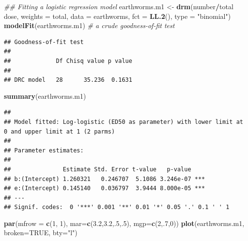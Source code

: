 \documentclass[letterpaper,]{book}
\newenvironment{Shaded}{\begin{snugshade}}{\end{snugshade}}
\newcommand{\CommentTok}[1]{\textcolor[rgb]{0.56,0.35,0.01}{\textit{#1}}}
\newcommand{\DataTypeTok}[1]{\textcolor[rgb]{0.13,0.29,0.53}{#1}}
\newcommand{\DecValTok}[1]{\textcolor[rgb]{0.00,0.00,0.81}{#1}}
\newcommand{\FloatTok}[1]{\textcolor[rgb]{0.00,0.00,0.81}{#1}}
\newcommand{\KeywordTok}[1]{\textcolor[rgb]{0.13,0.29,0.53}{\textbf{#1}}}
\newcommand{\NormalTok}[1]{#1}
\newcommand{\OperatorTok}[1]{\textcolor[rgb]{0.81,0.36,0.00}{\textbf{#1}}}
\newcommand{\OtherTok}[1]{\textcolor[rgb]{0.56,0.35,0.01}{#1}}
\newcommand{\StringTok}[1]{\textcolor[rgb]{0.31,0.60,0.02}{#1}}
\begin{document}
\begin{Shaded}
\begin{Highlighting}[]
\CommentTok{## Fitting a logistic regression model}
\NormalTok{earthworms.m1 <-}\StringTok{ }\KeywordTok{drm}\NormalTok{(number}\OperatorTok{/}\NormalTok{total }\OperatorTok{~}\StringTok{ }\NormalTok{dose, }\DataTypeTok{weights =}\NormalTok{ total, }\DataTypeTok{data =}\NormalTok{ earthworms,}
                     \DataTypeTok{fct =} \KeywordTok{LL.2}\NormalTok{(), }\DataTypeTok{type =} \StringTok{"binomial"}\NormalTok{)}
\KeywordTok{modelFit}\NormalTok{(earthworms.m1)  }\CommentTok{# a crude goodness-of-fit test}
\end{Highlighting}
\end{Shaded}

\begin{verbatim}
## Goodness-of-fit test
## 
##             Df Chisq value p value
##                                   
## DRC model   28      35.236  0.1631
\end{verbatim}

\begin{Shaded}
\begin{Highlighting}[]
\KeywordTok{summary}\NormalTok{(earthworms.m1)}
\end{Highlighting}
\end{Shaded}

\begin{verbatim}
## 
## Model fitted: Log-logistic (ED50 as parameter) with lower limit at 0 and upper limit at 1 (2 parms)
## 
## Parameter estimates:
## 
##               Estimate Std. Error t-value   p-value    
## b:(Intercept) 1.260321   0.246707  5.1086 3.246e-07 ***
## e:(Intercept) 0.145140   0.036797  3.9444 8.000e-05 ***
## ---
## Signif. codes:  0 '***' 0.001 '**' 0.01 '*' 0.05 '.' 0.1 ' ' 1
\end{verbatim}

\begin{Shaded}
\begin{Highlighting}[]
\KeywordTok{par}\NormalTok{(}\DataTypeTok{mfrow =} \KeywordTok{c}\NormalTok{(}\DecValTok{1}\NormalTok{, }\DecValTok{1}\NormalTok{), }\DataTypeTok{mar=}\KeywordTok{c}\NormalTok{(}\FloatTok{3.2}\NormalTok{,}\FloatTok{3.2}\NormalTok{,.}\DecValTok{5}\NormalTok{,.}\DecValTok{5}\NormalTok{), }\DataTypeTok{mgp=}\KeywordTok{c}\NormalTok{(}\DecValTok{2}\NormalTok{,.}\DecValTok{7}\NormalTok{,}\DecValTok{0}\NormalTok{))}
\KeywordTok{plot}\NormalTok{(earthworms.m1, }\DataTypeTok{broken=}\OtherTok{TRUE}\NormalTok{, }\DataTypeTok{bty=}\StringTok{"l"}\NormalTok{)}
\end{Highlighting}
\end{Shaded}
\end{document}
